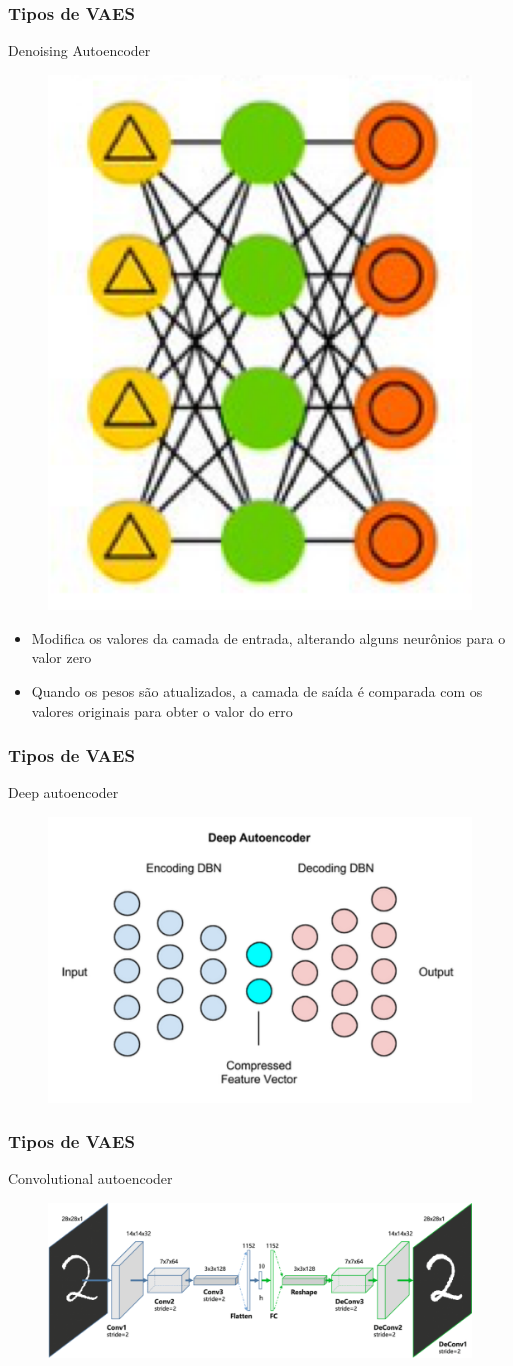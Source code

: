 \documentclass{beamer}
\begin{document}
\begin{frame}
	\frametitle{Tipos de VAES}
	\begin{block}{Denoising Autoencoder}
		\begin{figure}
			\centering
			\includegraphics[width=0.2\linewidth]{figures/vaes_archi3}
		\end{figure}
		\begin{itemize}
			\item Modifica os valores da camada de entrada, alterando alguns
			neurônios para o valor zero
			\item Quando os pesos são atualizados, a camada de saída é comparada
			com os valores originais para obter o valor do erro
		\end{itemize}
	\end{block}
\end{frame}
\begin{frame}
	\frametitle{Tipos de VAES}
	\begin{block}{Deep autoencoder}
		\begin{figure}
			\centering
			\includegraphics[width=0.7\linewidth]{figures/vaes_archi4}
		\end{figure}
	\end{block}
\end{frame}
\begin{frame}
	\frametitle{Tipos de VAES}
	\begin{block}{Convolutional autoencoder}
		\begin{figure}
			\centering
			\includegraphics[width=0.7\linewidth]{figures/vaes_archi5}
		\end{figure}
	\end{block}
\end{frame}
\end{document}
